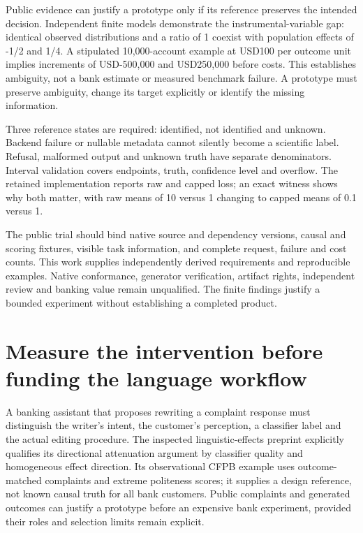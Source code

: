 Public evidence can justify a prototype only if its reference preserves
the intended decision. Independent finite models demonstrate the
instrumental-variable gap: identical observed distributions and a ratio
of 1 coexist with population effects of -1/2 and 1/4. A stipulated
10,000-account example at USD100 per outcome unit implies increments of
USD-500,000 and USD250,000 before costs. This establishes ambiguity, not
a bank estimate or measured benchmark failure. A prototype must preserve
ambiguity, change its target explicitly or identify the missing
information. \citep{exec25_bor_sources,exec25_bor_reference}

Three reference states are required: identified, not identified and
unknown. Backend failure or nullable metadata cannot silently become a
scientific label. Refusal, malformed output and unknown truth have
separate denominators. Interval validation covers endpoints, truth,
confidence level and overflow. The retained implementation reports raw
and capped loss; an exact witness shows why both matter, with raw means
of 10 versus 1 changing to capped means of 0.1 versus 1.
\citep{exec25_bor_sources,exec25_bor_reference}

The public trial should bind native source and dependency versions,
causal and scoring fixtures, visible task information, and complete
request, failure and cost counts. This work supplies independently
derived requirements and reproducible examples. Native conformance,
generator verification, artifact rights, independent review and banking
value remain unqualified. The finite findings justify a bounded
experiment without establishing a completed product.
\citep{exec25_bor_reference}

\hypertarget{measure-the-intervention-before-funding-the-language-workflow}{%
\section{Measure the intervention before funding the language
workflow}\label{measure-the-intervention-before-funding-the-language-workflow}}

A banking assistant that proposes rewriting a complaint response must
distinguish the writer's intent, the customer's perception, a classifier
label and the actual editing procedure. The inspected linguistic-effects
preprint explicitly qualifies its directional attenuation argument by
classifier quality and homogeneous effect direction. Its observational
CFPB example uses outcome-matched complaints and extreme politeness
scores; it supplies a design reference, not known causal truth for all
bank customers. Public complaints and generated outcomes can justify a
prototype before an expensive bank experiment, provided their roles and
selection limits remain explicit. \citep{exec28_lm_pryzant}

